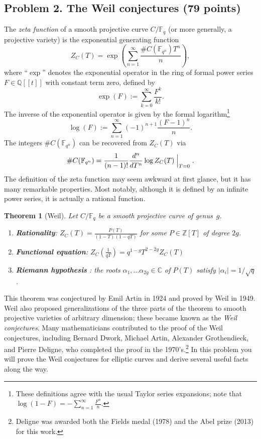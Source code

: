 \documentclass[11pt]{article}
\newcommand{\Fq}{\mathbb{F}_q}
\newcommand{\Fqn}{\mathbb{F}_{q^n}}
\newcommand{\Q}{\mathbb{Q}}
\newcommand{\C}{\mathbb{C}}
\newcommand{\Z}{\mathbb{Z}}
\newtheorem{theorem}{Theorem}
\begin{document}
\subsection*{Problem 2. The Weil conjectures (79 points)}
The \emph{zeta function} of a smooth projective curve $C/\Fq$ (or more generally, a projective variety) is the exponential generating function
\[
Z_C(T) = \exp\left(\sum_{n=1}^\infty\frac{\#C(\Fqn)T^n}{n}\right),
\]
where ``$\exp$'' denotes the exponential operator in the ring of formal power series $F\in\Q[[t]]$ with constant term zero, defined by
\[
\exp(F) := \sum_{k=0}^\infty \frac{F^k}{k!}.
\]
The inverse of the exponential operator is given by the formal logarithm\footnote{These definitions agree with the usual Taylor series expansions; note that $\log(1-F)=-\sum_{n=1}^\infty\frac{F^n}{n}$.}
\[
\log(F) := \sum_{n=1}^\infty (-1)^{n+1}\frac{(F-1)^n}{n}.
\]
The integers $\#C(\Fqn)$ can be recovered from $Z_C(T)$ via
\[
\#C(\Fqn)=\frac{1}{(n-1)!}\frac{d^n}{dT^n}\log Z_C(T)\Bigm|_{T=0}.
\]
The definition of the zeta function may seem awkward at first glance, but it has many remarkable properties.
Most notably, although it is defined by an infinite power series, it is actually a rational function.
\begin{theorem}[Weil]
Let $C/\Fq$ be a smooth projective curve of genus~$g$.
\begin{enumerate}[{\bf (i)}]
\item \textbf{Rationality}: $Z_C(T) =\frac{P(T)}{(1-T)(1-qT)}$ for some $P\in\Z[T]$ of degree $2g$.
\item \textbf{Functional equation}: $Z_C(\frac{1}{qT}) = q^{1-g}T^{2-2g}Z_C(T)$
\item \textbf{Riemann hypothesis}  : the roots $\alpha_1,\ldots\alpha_{2g}\in\C$ of $P(T)$ satisfy $|\alpha_i|=1/\sqrt{q}$.
\end{enumerate}
\end{theorem}
This theorem was conjectured by Emil Artin in 1924 and proved by Weil in 1949.  Weil also proposed generalizations of the three parts of the theorem to smooth projective varieties of arbitrary dimension; these became known as the \emph{Weil conjectures}.
Many mathematicians contributed to the proof of the Weil conjectures, including Bernard Dwork, Michael Artin, Alexander Grothendieck, and Pierre Deligne, who completed the proof in the 1970's.\footnote{Deligne was awarded both the Fields medal (1978) and the Abel prize (2013) for this work.}
In this problem you will prove the Weil conjectures for elliptic curves and derive several useful facts along the way.
\end{document}
